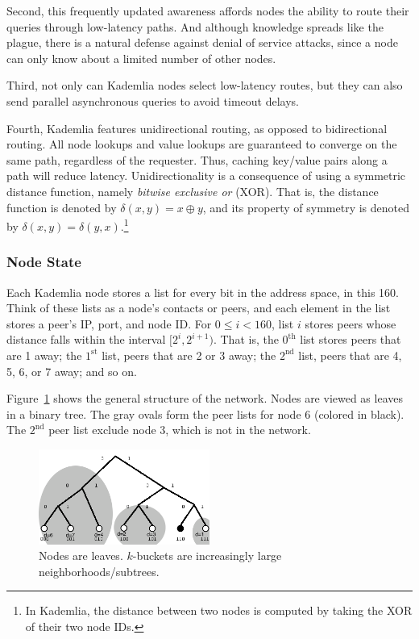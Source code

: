 \documentclass[12pt,twocolumn]{article}
\begin{document}
Second, this frequently updated awareness affords nodes the ability to route their queries through low-latency paths.
And although knowledge spreads like the plague, there is a natural defense against denial of service attacks, since a node can only know about a limited number of other nodes.

Third, not only can Kademlia nodes select low-latency routes, but they can also send parallel asynchronous queries to avoid timeout delays.

Fourth, Kademlia features unidirectional routing, as opposed to bidirectional routing.
All node lookups and value lookups are guaranteed to converge on the same path, regardless of the requester.
Thus, caching key/value pairs along a path will reduce latency.
Unidirectionality is a consequence of using a symmetric distance function, namely \emph{bitwise exclusive or} (XOR).
That is, the distance function is denoted by $\delta(x,y) = x \oplus y$, and its property of symmetry is denoted by $\delta(x,y) = \delta(y,x)$.\footnote{In Kademlia, the distance between two nodes is computed by taking the XOR of their two node IDs.}

\subsubsection{Node State}
Each Kademlia node stores a list for every bit in the address space, in this 160.
Think of these lists as a node's contacts or peers, and each element in the list stores a peer's IP, port, and node ID.
For $0 \leq i < 160$, list $i$ stores peers whose distance falls within the interval $[2^i, 2^{i+1})$.
That is, the $0^{\mathrm{th}}$ list stores peers that are 1 away; the $1^{\mathrm{st}}$ list, peers that are 2 or 3 away; the $2^{\mathrm{nd}}$ list, peers that are 4, 5, 6, or 7 away; and so on.

Figure~\ref{tree} shows the general structure of the network. Nodes are viewed as leaves in a binary tree. The gray ovals form the peer lists for node 6 (colored in black). The $2^{\mathrm{nd}}$ peer list exclude node 3, which is not in the network.

\begin{figure}[h!]
  \centering
  \includegraphics[width=0.5\textwidth]{images/tree}
  \caption{\label{tree}Nodes are leaves. $k$-buckets are increasingly large neighborhoods/subtrees.}
\end{figure}
\end{document}
